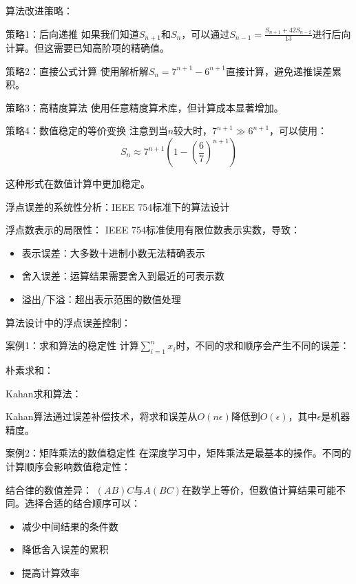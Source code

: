 算法改进策略：

策略1：后向递推
如果我们知道$S_{n+1}$和$S_n$，可以通过$S_{n-1} = \frac{S_{n+1} + 42S_{n-2}}{13}$进行后向计算。但这需要已知高阶项的精确值。

策略2：直接公式计算
使用解析解$S_n = 7^{n+1} - 6^{n+1}$直接计算，避免递推误差累积。

策略3：高精度算法
使用任意精度算术库，但计算成本显著增加。

策略4：数值稳定的等价变换
注意到当$n$较大时，$7^{n+1} \gg 6^{n+1}$，可以使用：
$$S_n \approx 7^{n+1} \left(1 - \left(\frac{6}{7}\right)^{n+1}\right)$$

这种形式在数值计算中更加稳定。

浮点误差的系统性分析：IEEE 754标准下的算法设计

浮点数表示的局限性：
IEEE 754标准使用有限位数表示实数，导致：

\begin{itemize}
\item 表示误差：大多数十进制小数无法精确表示
\item 舍入误差：运算结果需要舍入到最近的可表示数
\item 溢出/下溢：超出表示范围的数值处理
\end{itemize}

算法设计中的浮点误差控制：

案例1：求和算法的稳定性
计算$\sum_{i=1}^n x_i$时，不同的求和顺序会产生不同的误差：

朴素求和：

Kahan求和算法：

Kahan算法通过误差补偿技术，将求和误差从$O(n\epsilon)$降低到$O(\epsilon)$，其中$\epsilon$是机器精度。

案例2：矩阵乘法的数值稳定性
在深度学习中，矩阵乘法是最基本的操作。不同的计算顺序会影响数值稳定性：

结合律的数值差异：
$(AB)C$与$A(BC)$在数学上等价，但数值计算结果可能不同。选择合适的结合顺序可以：
\begin{itemize}
\item 减少中间结果的条件数
\item 降低舍入误差的累积
\item 提高计算效率
\end{itemize}

